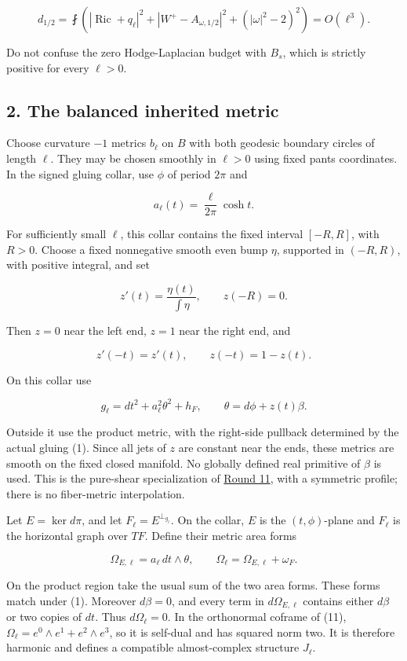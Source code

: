 \documentclass[
  11pt,
]{article}
\begin{document}
\[
 d_{1/2}=\fint\left(|\operatorname{Ric}+q_\ell|^2
       +|W^+-A_{\omega,1/2}|^2+(|\omega|^2-2)^2\right)=O(\ell^3).
 \tag{8}
\]

Do not confuse the zero Hodge-Laplacian budget with \(B_s\), which is
strictly positive for every \(\ell>0\).

\hypertarget{the-balanced-inherited-metric}{%
\subsection{2. The balanced inherited
metric}\label{the-balanced-inherited-metric}}

Choose curvature \(-1\) metrics \(b_\ell\) on \(B\) with both geodesic
boundary circles of length \(\ell\). They may be chosen smoothly in
\(\ell>0\) using fixed pants coordinates. In the signed gluing collar,
use \(\phi\) of period \(2\pi\) and

\[
 a_\ell(t)=\frac{\ell}{2\pi}\cosh t.
 \tag{9}
\]

For sufficiently small \(\ell\), this collar contains the fixed interval
\([-R,R]\), with \(R>0\). Choose a fixed nonnegative smooth even bump
\(\eta\), supported in \((-R,R)\), with positive integral, and set

\[
 z'(t)=\frac{\eta(t)}{\int\eta},\qquad
 z(-R)=0.
\]

Then \(z=0\) near the left end, \(z=1\) near the right end, and

\[
 z'(-t)=z'(t),\qquad z(-t)=1-z(t).
 \tag{10}
\]

On this collar use

\[
 g_\ell=dt^2+a_\ell^2\theta^2+h_F,
 \qquad \theta=d\phi+z(t)\beta.
 \tag{11}
\]

Outside it use the product metric, with the right-side pullback
determined by the actual gluing (1). Since all jets of \(z\) are
constant near the ends, these metrics are smooth on the fixed closed
manifold. No globally defined real primitive of \(\beta\) is used. This
is the pure-shear specialization of
\href{round11_closed_gluing.md}{Round 11}, with a symmetric profile;
there is no fiber-metric interpolation.

Let \(E=\ker d\pi\), and let \(F_\ell=E^{\perp_{g_\ell}}\). On the
collar, \(E\) is the \((t,\phi)\)-plane and \(F_\ell\) is the horizontal
graph over \(TF\). Define their metric area forms

\[
 \Omega_{E,\ell}=a_\ell\,dt\wedge\theta,\qquad
 \Omega_\ell=\Omega_{E,\ell}+\omega_F.
 \tag{12}
\]

On the product region take the usual sum of the two area forms. These
forms match under (1). Moreover \(d\beta=0\), and every term in
\(d\Omega_{E,\ell}\) contains either \(d\beta\) or two copies of \(dt\).
Thus \(d\Omega_\ell=0\). In the orthonormal coframe of (11),
\(\Omega_\ell=e^0\wedge e^1+e^2\wedge e^3\), so it is self-dual and has
squared norm two. It is therefore harmonic and defines a compatible
almost-complex structure \(J_\ell\).
\end{document}
